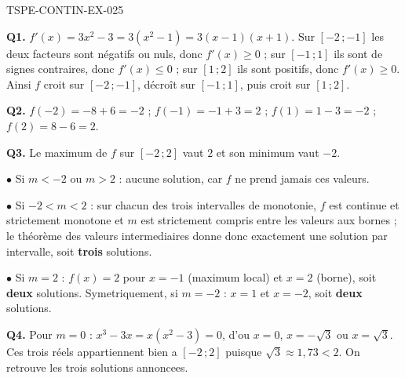 \begin{corrige}{TSPE-CONTIN-EX-025}

\textbf{Q1.} $f'(x) = 3x^2 - 3 = 3(x^2-1) = 3(x-1)(x+1)$. Sur $[-2\,;-1]$ les deux facteurs sont négatifs ou nuls, donc $f'(x) \geq 0$ ; sur $[-1\,;1]$ ils sont de signes contraires, donc $f'(x) \leq 0$ ; sur $[1\,;2]$ ils sont positifs, donc $f'(x) \geq 0$. Ainsi $f$ croit sur $[-2\,;-1]$, décroît sur $[-1\,;1]$, puis croit sur $[1\,;2]$.

\textbf{Q2.} $f(-2) = -8 + 6 = -2$ ; $f(-1) = -1 + 3 = 2$ ; $f(1) = 1 - 3 = -2$ ; $f(2) = 8 - 6 = 2$.

\textbf{Q3.} Le maximum de $f$ sur $[-2\,;2]$ vaut $2$ et son minimum vaut $-2$.

$\bullet$ Si $m < -2$ ou $m > 2$ : aucune solution, car $f$ ne prend jamais ces valeurs.

$\bullet$ Si $-2 < m < 2$ : sur chacun des trois intervalles de monotonie, $f$ est continue et strictement monotone et $m$ est strictement compris entre les valeurs aux bornes ; le théorème des valeurs intermediaires donne donc exactement une solution par intervalle, soit \textbf{trois} solutions.

$\bullet$ Si $m = 2$ : $f(x) = 2$ pour $x = -1$ (maximum local) et $x = 2$ (borne), soit \textbf{deux} solutions. Symetriquement, si $m = -2$ : $x = 1$ et $x = -2$, soit \textbf{deux} solutions.

\textbf{Q4.} Pour $m = 0$ : $x^3 - 3x = x(x^2-3) = 0$, d'ou $x = 0$, $x = -\sqrt{3}$ ou $x = \sqrt{3}$. Ces trois réels appartiennent bien a $[-2\,;2]$ puisque $\sqrt{3} \approx 1{,}73 < 2$. On retrouve les trois solutions annoncees.
\end{corrige}
